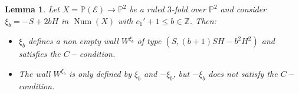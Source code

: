 \documentclass[11pt,twoside]{amsart}
\newtheorem{lemma}[theorem]{Lemma}
\theoremstyle{definition}
\newcommand{\Num}{\operatorname{Num}}
\begin{document}

\begin{lemma}
\label{lemma_chib}
    Let $X=\mathbb{P}(\mathcal{E})\rightarrow\mathbb{P}^2$ be a ruled $3$-fold  over $\mathbb{P}^2$ and  consider $\xi_b= -S+2bH$ in $\Num(X)$ with $c_1'+1\leq b\in\mathbb{Z}$.
    Then:
    \begin{itemize}
        \item[i)] $\xi_b$ defines a non empty wall $W^{\xi_b}$ of type $(S, (b+1)SH-b^2H^2)$ and satisfies the $C-$condition.
        \item[ii)] The wall $W^{\xi_b}$ is only defined by $ \xi_b$ and $-\xi_b$, but $-\xi_b$ does not satisfy the $C-$condition. 
    \end{itemize}
    
    
    
    
\end{lemma}
\end{document}
